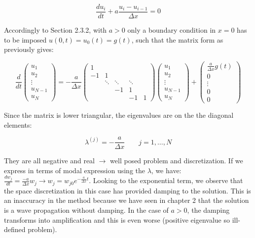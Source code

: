 \begin{equation}
\frac{d u_i}{dt} + a \frac{u_i - u_{i-1}}{\Delta x} = 0
\end{equation}

Accordingly to Section 2.3.2, with $a>0$ only a boundary condition in $x=0$ has to be imposed $u(0,t) = u_0(t) = g(t)$, such that the matrix form as previously gives:

\begin{equation}
\frac{d}{dt} \left(\begin{array}{c}
u_1\\
u_2 \\
\vdots\\
u_{N-1}\\
u_{N}
\end{array} \right) = -\frac{a }{\Delta x}
\left(
\begin{array}{ccccc}
1  \\
-1 & 1  \\
& \ddots & \ddots & \ddots \\
&  & -1 & 1 \\
& & & -1& 1
\end{array}
\right)\left(\begin{array}{c}
u_1\\
u_2 \\
\vdots\\
u_{N-1}\\
u_{N}
\end{array} \right)
+
\left(\begin{array}{c}
\frac{a}{\Delta x}g(t)\\
0\\
\vdots\\
0\\
0
\end{array} \right)
\end{equation}

Since the matrix is lower triangular, the eigenvalues are on the the diagonal elements: 

\begin{equation}
\lambda ^{(j)}= -\frac{a}{\Delta x} \qquad j = 1, \dots, N
\end{equation}

They are all negative and real $\rightarrow$ well posed problem and discretization. 
If we express in terms of modal expression using the $\lambda$, we have: $\frac{dw_j}{dt} = \frac{-a}{\Delta x}w_j \rightarrow w_j = w_{j0} e^{-\frac{a}{\Delta x}t}$. Looking to the exponential term, we observe that the space discretization in this case has provided damping to the solution. This is an inaccuracy in the method because we have seen in chapter 2 that the solution is a wave propagation without damping. In the case of $a>0$, the damping transforms into amplification and this is even worse (positive eigenvalue so ill-defined problem). 

